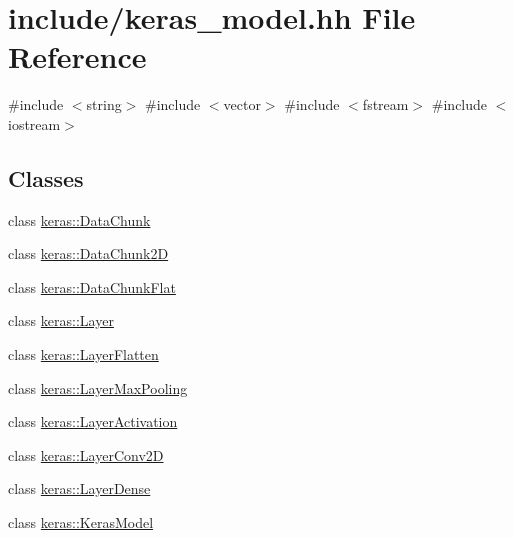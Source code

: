 \hypertarget{keras__model_8hh}{}\section{include/keras\+\_\+model.hh File Reference}
\label{keras__model_8hh}
{\ttfamily \#include $<$string$>$}\newline
{\ttfamily \#include $<$vector$>$}\newline
{\ttfamily \#include $<$fstream$>$}\newline
{\ttfamily \#include $<$iostream$>$}\newline
\subsection*{Classes}
\begin{DoxyCompactItemize}
\item 
class \mbox{\hyperlink{classkeras_1_1_data_chunk}{keras\+::\+Data\+Chunk}}
\item 
class \mbox{\hyperlink{classkeras_1_1_data_chunk2_d}{keras\+::\+Data\+Chunk2D}}
\item 
class \mbox{\hyperlink{classkeras_1_1_data_chunk_flat}{keras\+::\+Data\+Chunk\+Flat}}
\item 
class \mbox{\hyperlink{classkeras_1_1_layer}{keras\+::\+Layer}}
\item 
class \mbox{\hyperlink{classkeras_1_1_layer_flatten}{keras\+::\+Layer\+Flatten}}
\item 
class \mbox{\hyperlink{classkeras_1_1_layer_max_pooling}{keras\+::\+Layer\+Max\+Pooling}}
\item 
class \mbox{\hyperlink{classkeras_1_1_layer_activation}{keras\+::\+Layer\+Activation}}
\item 
class \mbox{\hyperlink{classkeras_1_1_layer_conv2_d}{keras\+::\+Layer\+Conv2D}}
\item 
class \mbox{\hyperlink{classkeras_1_1_layer_dense}{keras\+::\+Layer\+Dense}}
\item 
class \mbox{\hyperlink{classkeras_1_1_keras_model}{keras\+::\+Keras\+Model}}
\end{DoxyCompactItemize}
